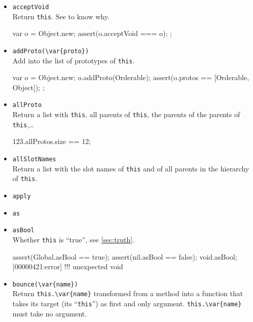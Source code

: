 \begin{itemize}
\item \lstinline|acceptVoid|\\
  Return \lstinline|this|.  See  to know why.
\begin{urbiscript}[firstnumber=last]
{
  var o = Object.new;
  assert(o.acceptVoid === o);
};
\end{urbiscript}


\item \lstinline|addProto(\var{proto})|\\
  Add  into the list of prototypes of \lstinline|this|.
\begin{urbiscript}[firstnumber=last]
{
  var o = Object.new;
  o.addProto(Orderable);
  assert(o.protos == [Orderable, Object]);
};
\end{urbiscript}

\item \lstinline|allProto|\\
  Return a list with \lstinline|this|, all parents of
  \lstinline|this|, the parents of the parents of
  \lstinline|this|,\ldots
\begin{urbiassert}[firstnumber=last]
123.allProtos.size == 12;
\end{urbiassert}

\item \lstinline|allSlotNames|\\
  Return a list with the slot names of \lstinline|this| and of all
  parents in the hierarchy of \lstinline|this|.

\item \lstinline|apply|\\

\item \lstinline|as|\\

\item \lstinline|asBool|\\
  Whether \lstinline|this| is ``true'', see \autoref{sec:truth}.

\begin{urbiscript}[firstnumber=last]
assert(Global.asBool == true);
assert(nil.asBool ==    false);
void.asBool;
[00000421:error] !!! unexpected void
\end{urbiscript}

\item \lstinline|bounce(\var{name})|\\
  Return \lstinline|this.\var{name}| transformed from a method into a
  function that takes its target (its ``\lstinline|this|'') as first
  and only argument.  \lstinline|this.\var{name}| must take no
  argument.


\end{itemize}

